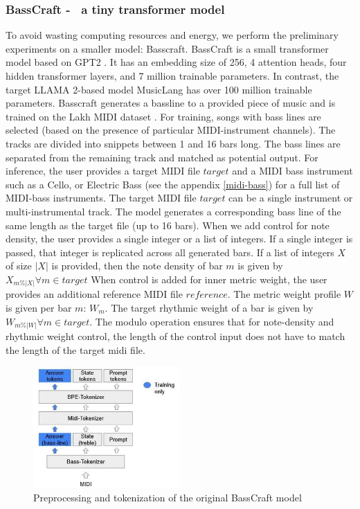 \subsubsection{BassCraft -  a tiny transformer model}
To avoid wasting computing resources and energy, we perform the preliminary experiments on a smaller model: Basscraft. BassCraft is a small transformer model based on GPT2 \cite{Radford_Wu_Child_Luan_gpt2_2019}. It has an embedding size of 256, 4 attention heads, four hidden transformer layers, and 7 million trainable parameters. In contrast, the target LLAMA 2-based model MusicLang has over 100 million trainable parameters. Basscraft generates a bassline to a provided piece of music and is trained on the Lakh MIDI dataset \cite{Raffel_2016}. For training, songs with bass lines are selected (based on the presence of particular MIDI-instrument channels). The tracks are divided into snippets between 1 and 16 bars long. The bass lines are separated from the remaining track and matched as potential output. 
For inference, the user provides a target MIDI file $target$ and a MIDI bass instrument such as a Cello, or Electric Bass (see the appendix \ref{midi-bass}) for a full list of MIDI-bass instruments. The target MIDI file $target$ can be a single instrument or multi-instrumental track. The model generates a corresponding bass line of the same length as the target file (up to 16 bars). When we add control for note density, the user provides a single integer or a list of integers. If a single integer is passed, that integer is replicated across all generated bars. If a list of integers $X$ of size $|X|$ is provided, then the note density of bar $m$ is given by $X_{m\%|X|} \forall m \in target$
When control is added for inner metric weight, the user provides an additional reference MIDI file $reference$. The metric weight profile $W$ is given per bar $m$: $W_{m}$. The target rhythmic weight of a bar is given by $W_{m\%|W|} \forall m \in target$. The modulo operation ensures that for note-density and rhythmic weight control, the length of the control input does not have to match the length of the target midi file.    

\begin{figure}[H]
\centering
\includegraphics[width=0.5\textwidth]{IMAGES/Preprocessing1.jpg} 
\caption{Preprocessing and tokenization of the original BassCraft model}
\label{fig:preprocessing1}
\end{figure}

